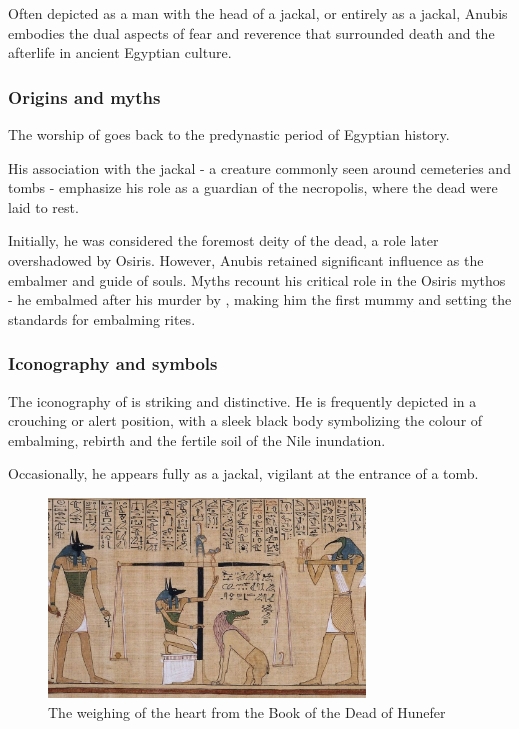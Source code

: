 Often depicted as a man with the head of a jackal, or entirely as a jackal, Anubis embodies the dual aspects of fear and reverence that surrounded death and the afterlife in ancient Egyptian culture.

\subsubsection*{Origins and myths}
The worship of  goes back to the predynastic period of Egyptian history.

His association with the jackal - a creature commonly seen around cemeteries and tombs - emphasize his role as a guardian of the necropolis, where the dead were laid to rest.

Initially, he was considered the foremost deity of the dead, a role later overshadowed by Osiris. However, Anubis retained significant influence as the embalmer and guide of souls. Myths recount his critical role in the Osiris mythos - he embalmed  after his murder by , making him the first mummy and setting the standards for embalming rites.

\subsubsection*{Iconography and symbols}
The iconography of  is striking and distinctive. He is frequently depicted in a crouching or alert position, with a sleek black body symbolizing the colour of embalming, rebirth and the fertile soil of the Nile inundation.

Occasionally, he appears fully as a jackal, vigilant at the entrance of a tomb.

\begin{figure} [H]
	\centering
	\includegraphics[width=0.75\textwidth]{../photos/Anubis_Hunefer}
	\caption{The weighing of the heart from the Book of the Dead of Hunefer}
\end{figure}

